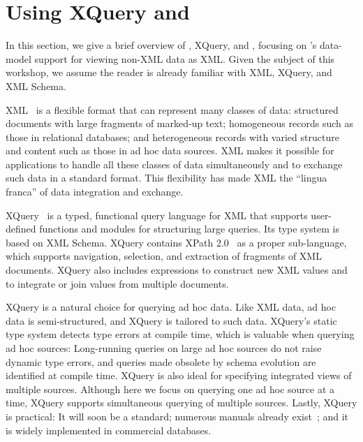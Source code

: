 \section{Using XQuery and \Galax{}}
\label{section:galax}

In this section, we give a brief overview of \Xml{}, XQuery, and
\Galax{}, focusing on \Galax{}'s data-model support for viewing
non-XML data as XML.  Given the subject of this workshop, we assume
the reader is already familiar with XML, XQuery, and XML Schema.

XML~\cite{xml10} is a flexible format that can represent many classes
of data: structured documents with large fragments of marked-up text;
homogeneous records such as those in relational databases; and
heterogeneous records with varied structure and content such as those
in ad hoc data sources.  XML makes it possible for applications to
handle all these classes of data simultaneously and to exchange such
data in a standard format.  This flexibility has made XML the ``lingua
franca'' of data integration and exchange.

XQuery~\cite{xquery10} is a typed, functional query language for XML
that supports user-defined functions and modules for structuring large
queries.  Its type system is based on XML Schema.  XQuery contains
XPath 2.0~\cite{xpath20} as a proper sub-language, which supports
navigation, selection, and extraction of fragments of XML documents.
XQuery also includes expressions to construct new XML values and to
integrate or join values from multiple documents.  

XQuery is a natural choice for querying ad hoc data.  Like XML data,
ad hoc data is semi-structured, and XQuery is tailored to 
such data.  
XQuery's static type system detects type errors at compile time, which
is valuable when querying ad hoc sources: Long-running queries on
large ad hoc sources do not raise dynamic type errors, and queries
made obsolete by schema evolution are identified at compile time.
XQuery is also ideal for specifying integrated views of multiple
sources.  Although here we focus on querying one ad hoc source at a
time, XQuery supports simultaneous querying of multiple 
sources. Lastly, XQuery is practical: It will soon be a
standard; numerous manuals already exist~\cite{brundage2004}; and it is widely implemented
in commercial databases.

